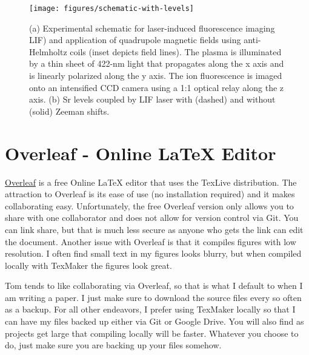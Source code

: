 \documentclass[11pt]{article}		%
\begin{document}
\begin{figure}[h]
	\centering
	\captionsetup{width=.75\linewidth} %
	\texttt{[image: figures/schematic-with-levels]}
	\caption{(a) Experimental schematic for laser-induced fluorescence imaging LIF) and application of quadrupole magnetic fields using anti-Helmholtz coils (inset depicts field lines). The plasma is illuminated by a thin sheet of 422-nm light that propagates along the x axis and is linearly polarized along the y axis. The ion fluorescence is imaged onto an intensified CCD camera using a 1:1 optical relay along the z axis. (b) Sr levels coupled by LIF laser with (dashed) and without (solid) Zeeman shifts.}
	\label{fig:exp-schem}
\end{figure}

\section{Overleaf - Online LaTeX Editor}

\href{https://www.overleaf.com/}{Overleaf} is a free Online LaTeX editor that uses the TexLive distribution. The attraction to Overleaf is its ease of use (no installation required) and it makes collaborating easy. Unfortunately, the free Overleaf version only allows you to share with one collaborator and does not allow for version control via Git. You can link share, but that is much less secure as anyone who gets the link can edit the document. Another issue with Overleaf is that it compiles figures with low resolution. I often find small text in my figures looks blurry, but when compiled locally with TexMaker the figures look great. 

Tom tends to like collaborating via Overleaf, so that is what I default to when I am writing a paper. I just make sure to download the source files every so often as a backup. For all other endeavors, I prefer using TexMaker locally so that I can have my files backed up either via Git or Google Drive. You will also find as projects get large that compiling locally will be faster. Whatever you choose to do, just make sure you are backing up your files somehow.

 
\end{document}
